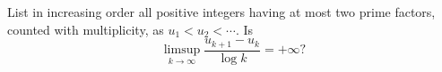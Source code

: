 List in increasing order all positive integers having at most two prime factors, counted with multiplicity, as $u_1<u_2<\cdots$. Is
\[
\limsup_{k\to\infty}\frac{u_{k+1}-u_k}{\log k}=+\infty?
\]

